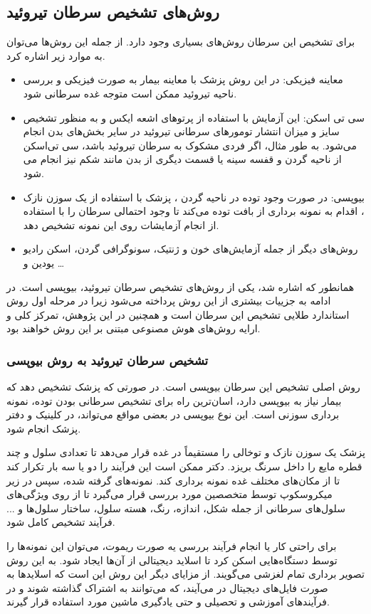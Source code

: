 \subsection{روش‌های تشخیص سرطان تیروئید}\label{subsec:روش-های-تشخیص-سرطان-تیروئید}

برای تشخیص این سرطان روش‌های بسیاری وجود دارد.
از جمله این روش‌ها می‌توان به موارد زیر اشاره کرد.

\begin{itemize}
    \item معاینه فیزیکی:
    در این روش پزشک با معاینه بیمار به صورت فیزیکی و بررسی ناحیه تیروئید ممکن است متوجه غده سرطانی شود.
    \item سی تی اسکن:
    این آزمایش با استفاده از پرتوهای اشعه ایکس و به منظور تشخیص سایز و میزان انتشار تومورهای سرطانی تیروئید در سایر بخش‌های بدن انجام می‌شود.
    به طور مثال، اگر فردی مشکوک به سرطان تیروئید باشد، سی تی‌اسکن از ناحیه گردن و قفسه سینه یا قسمت دیگری از بدن مانند شکم نیز انجام می شود.
    \item بیوپسی:
    در صورت وجود توده در ناحیه گردن ، پزشک با استفاده از يک سوزن نازک ، اقدام به نمونه برداری از بافت توده می‌کند تا وجود احتمالی سرطان را با استفاده از انجام آزمایشات روی این نمونه تشخیص دهد.
    \item روش‌های دیگر از جمله آزمایش‌های خون و ژنتیک، سونوگرافی گردن، اسکن رادیو یودین و \ldots
\end{itemize}

همانطور که اشاره شد، یکی از روش‌های تشخیص سرطان تیروئید، بیوپسی است.
در ادامه به جزییات بیشتری از این روش پرداخته می‌شود زیرا در مرحله اول روش استاندارد طلایی تشخیص این سرطان است و همچنین در این پژوهش، تمرکز کلی و ارایه روش‌های هوش مصنوعی مبتنی بر این روش خواهند بود.

\subsubsection{تشخیص سرطان تیروئید به روش بیوپسی}
روش اصلی تشخیص این سرطان بیوپسی است.
در صورتی که پزشک تشخیص دهد که بیمار نیاز به بیوپسی دارد، اسان‌ترین راه برای تشخیص سرطانی بودن توده،
نمونه برداری سوزنی است.
این نوع بیوپسی در بعضی مواقع می‌تواند، در کلینیک و دفتر پزشک انجام شود.

پزشک یک سوزن نازک و توخالی را مستقیماً در غده قرار می‌دهد تا تعدادی سلول و چند قطره مایع را داخل سرنگ بریزد.
دکتر ممکن است این فرآیند را دو یا سه بار تکرار کند تا از مکان‌های مختلف غده نمونه برداری کند.
نمونه‌های گرفته شده، سپس در زیر میکروسکوپ توسط متخصصین مورد بررسی قرار می‌گیرد تا از روی ویژگی‌های سلول‌های سرطانی از جمله شکل، اندازه، رنگ، هسته سلول، ساختار سلول‌ها و ... فرآیند تشخیص کامل شود.

برای راحتی کار یا انجام فرآیند بررسی یه صورت ریموت، می‌توان این نمونه‌ها را توسط دستگاه‌هایی اسکن کرد تا اسلاید دیجیتالی از آن‌ها ایجاد شود.
به این روش تصویر برداری تمام لغزشی می‌گویند.
از مزایای دیگر این روش این است که اسلاید‌ها به صورت فایل‌های دیجیتال در می‌آیند، که می‌توانند به اشتراک گذاشته شوند و در فرآیند‌های آموزشی و تحصیلی و حتی یادگیری ماشین مورد استفاده قرار گیرند.


